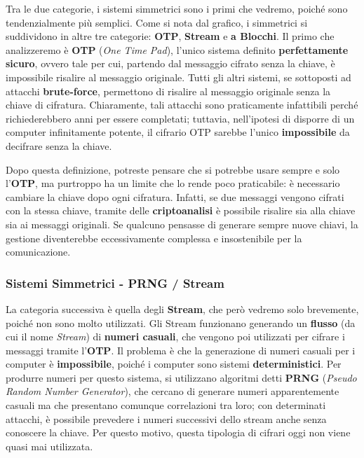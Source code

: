 \documentclass{report}
\begin{document}
Tra le due categorie, i sistemi simmetrici sono i primi che vedremo, poiché sono tendenzialmente più semplici. Come si nota dal grafico, i simmetrici si suddividono in altre tre categorie: \textbf{OTP}, \textbf{Stream} e \textbf{a Blocchi}. Il primo che analizzeremo è \textbf{OTP} (\textit{One Time Pad}), l’unico sistema definito \textbf{perfettamente sicuro}, ovvero tale per cui, partendo dal messaggio cifrato senza la chiave, è impossibile risalire al messaggio originale. Tutti gli altri sistemi, se sottoposti ad attacchi \textbf{brute-force}, permettono di risalire al messaggio originale senza la chiave di cifratura. Chiaramente, tali attacchi sono praticamente infattibili perché richiederebbero anni per essere completati; tuttavia, nell’ipotesi di disporre di un computer infinitamente potente, il cifrario OTP sarebbe l’unico \textbf{impossibile} da decifrare senza la chiave.

Dopo questa definizione, potreste pensare che si potrebbe usare sempre e solo l’\textbf{OTP}, ma purtroppo ha un limite che lo rende poco praticabile: è necessario cambiare la chiave dopo ogni cifratura. Infatti, se due messaggi vengono cifrati con la stessa chiave, tramite delle \textbf{criptoanalisi} è possibile risalire sia alla chiave sia ai messaggi originali. Se qualcuno pensasse di generare sempre nuove chiavi, la gestione diventerebbe eccessivamente complessa e insostenibile per la comunicazione.

\subsubsection{Sistemi Simmetrici - PRNG / Stream}

La categoria successiva è quella degli \textbf{Stream}, che però vedremo solo brevemente, poiché non sono molto utilizzati. Gli Stream funzionano generando un \textbf{flusso} (da cui il nome \textit{Stream}) di \textbf{numeri casuali}, che vengono poi utilizzati per cifrare i messaggi tramite l’\textbf{OTP}. Il problema è che la generazione di numeri casuali per i computer è \textbf{impossibile}, poiché i computer sono sistemi \textbf{deterministici}. Per produrre numeri per questo sistema, si utilizzano algoritmi detti \textbf{PRNG} (\textit{Pseudo Random Number Generator}), che cercano di generare numeri apparentemente casuali ma che presentano comunque correlazioni tra loro; con determinati attacchi, è possibile prevedere i numeri successivi dello stream anche senza conoscere la chiave. Per questo motivo, questa tipologia di cifrari oggi non viene quasi mai utilizzata.
\end{document}
